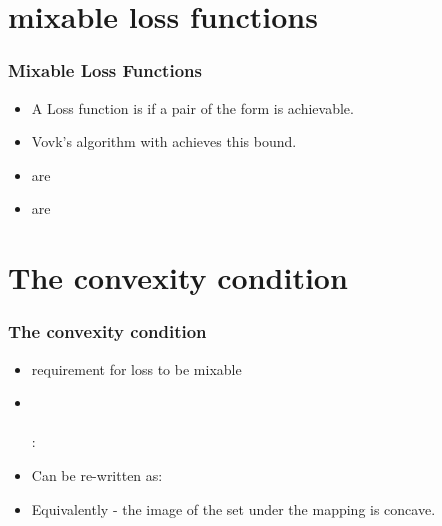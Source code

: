 \documentclass{beamer}
\begin{document}
\section{mixable loss functions}
\begin{frame}
\frametitle{Mixable Loss Functions}
\begin{itemize}
\item A Loss function is  if a pair of the form  is achievable.
\item Vovk's algorithm with  achieves this bound.
\item {} are 
\item {} are 
\end{itemize}
\end{frame}


\section{The convexity condition}

\begin{frame}
\frametitle{The convexity condition}
\begin{itemize}
\item requirement for loss to be  mixable
\item 
{} \\
\R{$\exists \B{\gamma} \in \Gamma$} \\
\R{$\forall \omega \in \Omega$}:
\item
Can be re-written as:
\item
Equivalently - the image of the set \R{$\Gamma$} under the
mapping
 is concave.
\end{itemize}
\end{frame}
\end{document}
